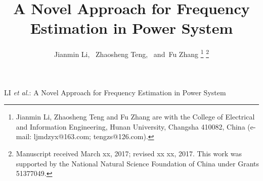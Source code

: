 \documentclass[journal,twoside]{IEEEtran}
\begin{document}
%
\title{A Novel Approach for Frequency Estimation in Power System}
%
%
%
\author{Jianmin  Li,~
		Zhaosheng Teng,~
		and~Fu Zhang%
		\thanks{Jianmin  Li, Zhaosheng Teng and Fu Zhang are with the College of Electrical and Information Engineering, Hunan University, Changsha 410082, China (e-mail: ljmdzyx@163.com; tengzs@126.com).} %
		\thanks{Manuscript received March xx, 2017; revised xx xx, 2017. This work was supported by the National Natural Science Foundation of China under Grants 51377049.}}%

% 
%

{LI \MakeLowercase{\textit{et al.}}: A Novel Approach for Frequency Estimation in Power System}
% 
\end{document}
